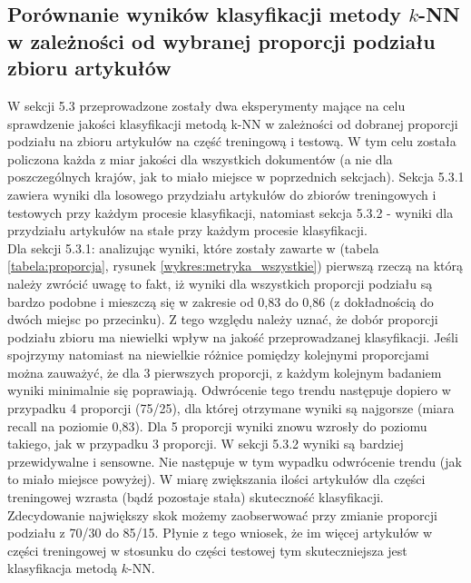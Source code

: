 \documentclass{classrep}
\begin{document}
\subsection{Porównanie wyników klasyfikacji metody $k$-NN w zależności od wybranej proporcji podziału zbioru artykułów}
W sekcji 5.3 przeprowadzone zostały dwa eksperymenty mające na celu sprawdzenie jakości klasyfikacji metodą k-NN w zależności od dobranej proporcji podziału na zbioru artykułów na część treningową i testową. W tym celu została policzona każda z miar jakości dla wszystkich dokumentów (a nie dla poszczególnych krajów, jak to miało miejsce w poprzednich sekcjach). Sekcja 5.3.1 zawiera wyniki dla losowego przydziału artykułów do zbiorów treningowych i testowych przy każdym procesie klasyfikacji, natomiast sekcja 5.3.2 - wyniki dla przydziału artykułów na stałe przy każdym procesie klasyfikacji.\\
\indent Dla sekcji 5.3.1: analizując wyniki, które zostały zawarte w (tabela \ref{tabela:proporcja}, rysunek \ref{wykres:metryka_wszystkie}) pierwszą rzeczą na którą należy zwrócić uwagę to fakt, iż wyniki dla wszystkich proporcji podziału są bardzo podobne i mieszczą się w zakresie od 0,83 do 0,86 (z dokładnością do dwóch miejsc po przecinku). Z tego względu należy uznać, że dobór proporcji podziału zbioru ma niewielki wpływ na jakość przeprowadzanej klasyfikacji. 
Jeśli spojrzymy natomiast na niewielkie różnice pomiędzy kolejnymi proporcjami można zauważyć, że dla 3 pierwszych proporcji, z każdym kolejnym badaniem wyniki minimalnie się poprawiają. Odwrócenie tego trendu następuje dopiero w przypadku 4 proporcji (75/25), dla której otrzymane wyniki są najgorsze (miara recall na poziomie 0,83). Dla 5 proporcji wyniki znowu wzrosły do poziomu takiego, jak w przypadku 3 proporcji. 
\indent W sekcji 5.3.2 wyniki są bardziej przewidywalne i sensowne. Nie następuje w tym wypadku odwrócenie trendu (jak to miało miejsce powyżej). W miarę zwiększania ilości artykułów dla części treningowej wzrasta (bądź pozostaje stała) skuteczność klasyfikacji. Zdecydowanie największy skok możemy zaobserwować przy zmianie proporcji podziału z 70/30 do 85/15. Płynie z tego wniosek, że im więcej artykułów w części treningowej w stosunku do części testowej tym skuteczniejsza jest klasyfikacja metodą $k$-NN.
\end{document}
